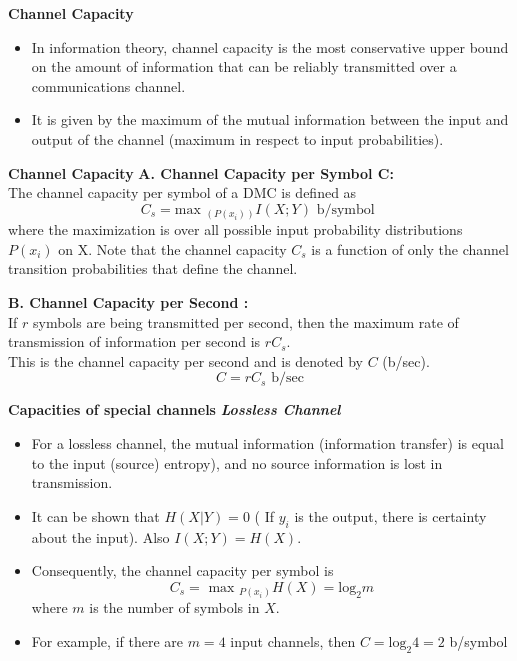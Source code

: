 


\noindent \textbf{Channel Capacity}
\begin{itemize} \item
In information theory, channel capacity is the most conservative upper bound on the amount of information that can be reliably transmitted over a communications channel. \item  It is given by the maximum of the mutual information between the input and output of the channel (maximum in respect to input probabilities).
\end{itemize}



\noindent \textbf{Channel Capacity}
\textbf{A. Channel Capacity per Symbol C:}\\
The channel capacity per symbol of a DMC is defined as
\[
C_s = \mbox{max }_{(P(x_i))}I(X; Y) \mbox{ b/symbol }
\]
where the maximization is over all possible input probability distributions $P(x_i)$ on X. Note that the
channel capacity $C_s$ is a function of only the channel transition probabilities that define the channel.




\textbf{B. Channel Capacity per Second :}\\
If $r$ symbols are being transmitted per second, then the maximum rate of transmission of
information per second is $rC_s$.\\ This is the channel capacity per second and is denoted by $C$ (b/sec).
\[C = rC_s     \mbox{          b/sec} \]






\noindent \textbf{Capacities of special channels}
\textbf{\emph{Lossless Channel}}\\\begin{itemize} \item For a lossless channel, the mutual information (information transfer) is equal to the input (source) entropy), and no source information is lost in transmission.\item It can be shown that $H(X|Y) = 0$ ( If $y_i$ is the output, there is certainty about the input). Also $I(X;Y) = H(X)$.
\item Consequently, the channel capacity per symbol is
\[ C_s = \mbox{ max }_{P(x_i)} H(X) = \mbox{log}_2m \]
where $m$ is the number of symbols in $X$.
\item For example, if there are $m=4$ input channels, then $C =  \mbox{log}_2 4 = 2$ b/symbol  \end{itemize}


